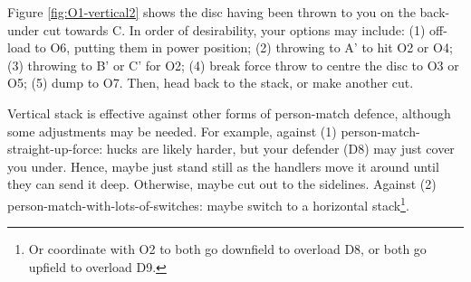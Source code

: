 \documentclass{tufte-handout}
\begin{document}
Figure \ref{fig:O1-vertical2} shows 
the disc having been thrown to you
on the back-under cut towards C. 
In order of desirability, 
your options may include: 
(1)
off-load to O6, 
putting them in power position;
(2) throwing to A' to hit O2 or O4;
(3) throwing to B' or C' for O2;
(4) break force throw 
to centre the disc
to O3 or O5;
(5) dump to O7.
Then, head back to the stack, 
or make another cut.

Vertical stack is effective
 against other forms of person-match defence, 
although some adjustments may be needed. 
For example, 
against (1) person-match-straight-up-force: 
hucks are likely harder, 
but your defender (D8) 
may just cover you under. 
Hence, maybe just
stand still as the handlers 
move it around until
they can send it deep.
Otherwise, 
maybe cut out to the sidelines.
Against (2) person-match-with-lots-of-switches: 
maybe switch
 to a horizontal stack\footnote{
Or coordinate 
with O2 to both
go downfield 
to overload D8, 
or both go upfield to overload D9.}.
\end{document}
